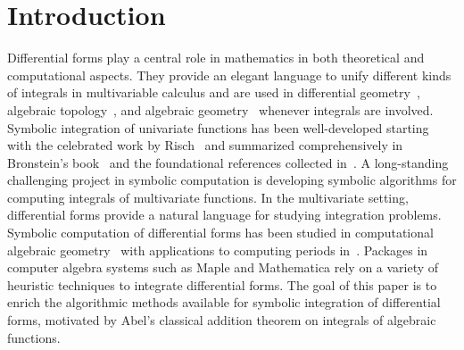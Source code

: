 \documentclass{amsart}
\theoremstyle{definition}
\numberwithin{equation}{section}
\numberwithin{thm}{section}
\begin{document}
\section{Introduction}
\label{SECT:intro}
Differential forms play a central role in mathematics in both theoretical and computational aspects. They provide an elegant language to unify different kinds of integrals in multivariable calculus and are used in differential geometry~\cite{Spivak},
algebraic topology~\cite{BottTu}, and algebraic geometry~\cite{Griffiths1978} whenever integrals are involved. Symbolic integration of univariate functions has been well-developed starting with the celebrated work by Risch~\cite{Risch1969} and summarized comprehensively in Bronstein's book~\cite{Bronstein} and the {foundational references collected in}~\cite{RaabSinger2022}. A long-standing challenging project in symbolic computation is developing symbolic algorithms for computing integrals of multivariate functions.  In the multivariate setting, differential forms provide a natural language for studying integration problems. 
Symbolic computation of differential forms has been studied in computational algebraic geometry~\cite{Burgisser2007, Burgisser2009}
with applications to computing periods in~\cite{Lairez2016}.
Packages in computer algebra systems such as Maple and Mathematica rely on a variety of  heuristic techniques to integrate differential forms. The goal of this paper is to enrich the algorithmic methods available for symbolic integration of differential forms, 
motivated by Abel's classical addition theorem on integrals of algebraic functions. 
\end{document}
